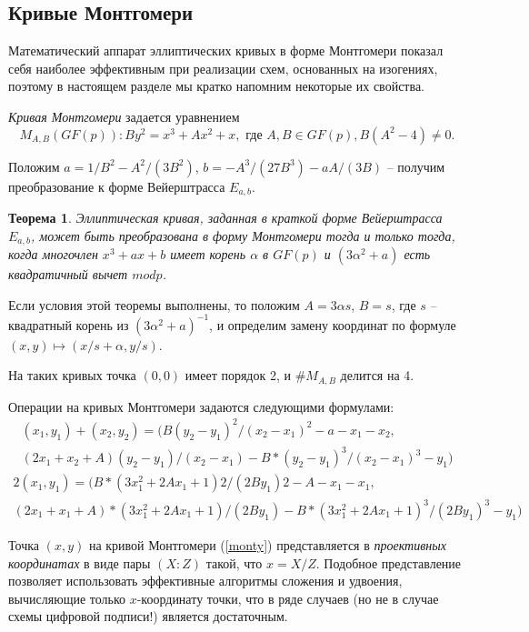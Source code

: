 \documentclass[a4paper,12pt]{article}
\newtheorem{theorem}{Теорема}
\theoremstyle{definition}
\begin{document}
\subsection{Кривые Монтгомери}
 

Математический аппарат эллиптических кривых в форме Монтгомери \cite{Mon} показал себя наиболее эффективным
при реализации схем, основанных на изогениях, поэтому в настоящем разделе мы кратко напомним некоторые их свойства.

\emph{Кривая Монтгомери} задается уравнением 
\begin{equation}\label{monty}
M_{A,B}(GF(p)): By^2=x^3+Ax^2+x, \text{ где } A,B\in GF(p), B(A^2-4)\neq 0.
\end{equation}

Положим $a=1/B^2-A^2/(3B^2)$, $b=-A^3/(27B^3)-aA/(3B)$ -- получим преобразование к форме Вейерштрасса $E_{a,b}$.

\begin{theorem} Эллиптическая кривая, заданная в краткой форме Вейерштрасса $E_{a,b}$,
 может быть преобразована в форму Монтгомери тогда и только тогда, когда многочлен $x^3+ax+b$ 
имеет корень $\alpha$ в $GF(p)$ и $(3\alpha^2+a)$ есть квадратичный вычет $mod p$.
\end{theorem}

Если условия этой теоремы выполнены, то положим $A=3\alpha s$, $B=s$, где $s$ -- квадратный корень из $(3\alpha^2+a)^{-1}$, 
и определим замену координат по формуле $(x,y)\mapsto (x/s+\alpha,y/s)$.

На таких кривых точка $(0,0)$ имеет порядок 2, и $\#M_{A,B}$ делится на 4.

Операции на кривых Монтгомери задаются следующими формулами:
\begin{multline*}
(x_1,y_1)+(x_2,y_2)=(B(y_2-y_1)^2/(x_2-x_1)^2-a-x_1-x_2, \\(2x_1+x_2+A)(y_2-y_1)/(x_2-x_1)-B*(y_2-y_1)^3/(x_2-x_1)^3-y_1)\end{multline*}
\begin{multline*}
2(x_1,y_1)=(B*(3x_1^2+2Ax_1+1)2/(2By_1)2-A-x_1-x_1 ,  \\(2x_1+x_1+A)*(3x_1^2+2Ax_1+1)/(2By_1)-B*(3x_1^2+2Ax_1+1)^3/(2By_1)^3-y_1)
\end{multline*}


Точка $(x,y)$ на кривой Монтгомери (\ref{monty}) представляется в \emph{проективных координатах} в виде пары $(X:Z)$ такой, что $x=X/Z$.
Подобное представление позволяет использовать эффективные алгоритмы сложения и удвоения, вычисляющие только $x$-координату точки, 
что в ряде случаев (но не в случае схемы цифровой подписи!) является достаточным.
\end{document}
